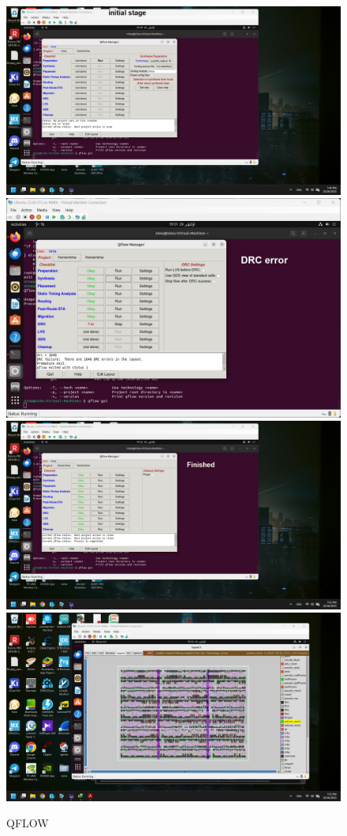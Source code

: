 \documentclass[16pt,answers]{exam}
\begin{document}
\begin{questions}
\begin{figure}[H]
\includegraphics[scale=0.2]{init.jpg}
\includegraphics[scale=0.2]{drc.jpg}
\includegraphics[scale=0.2]{finished.jpeg}
\includegraphics[scale=0.2]{layout.jpg}
\caption{QFLOW}
\end{figure}

\end{questions}
\end{document}
